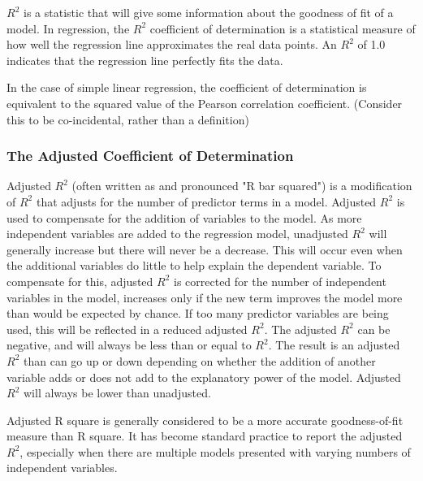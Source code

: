 \begin{frame}
$R^2$ is a statistic that will give some information about the goodness of fit of a model. In regression, the $R^2$ coefficient of determination is a statistical measure of how well the regression line approximates the real data points. An $R^2$ of 1.0 indicates that the regression line perfectly fits the data.

In the case of simple linear regression, the coefficient of determination is equivalent to the squared value of the Pearson correlation coefficient. (Consider this to be co-incidental, rather than a definition)
\end{frame}
\begin{frame}
\frametitle{The Adjusted Coefficient of Determination}
Adjusted $R^2$ (often written as and pronounced "R bar squared") is a modification of $R^2$ that adjusts for the number of predictor terms in a model. Adjusted $R^2$ is used to compensate for the addition of variables to the model.  As more independent variables are added to the regression model, unadjusted $R^2$ will generally increase but there will never be a decrease.  This will occur even when the additional variables do little to help explain the dependent variable.  To compensate for this, adjusted $R^2$  is corrected for the number of independent variables in the model, increases only if the new term improves the model more than would be expected by chance. If too many predictor variables are being used, this will be reflected in a reduced adjusted $R^2$. The adjusted $R^2$ can be negative, and will always be less than or equal to $R^2$. The result is an adjusted $R^2$ than can go up or down depending on whether the addition of another variable adds or does not add to the explanatory power of the model. Adjusted $R^2$ will always be lower than unadjusted.


Adjusted R square is generally considered to be a more accurate goodness-of-fit measure than R square. It has become standard practice to report the adjusted $R^2$, especially when there are multiple models presented with varying numbers of independent variables.

%
%
%
%
%
%
%
\end{frame}
